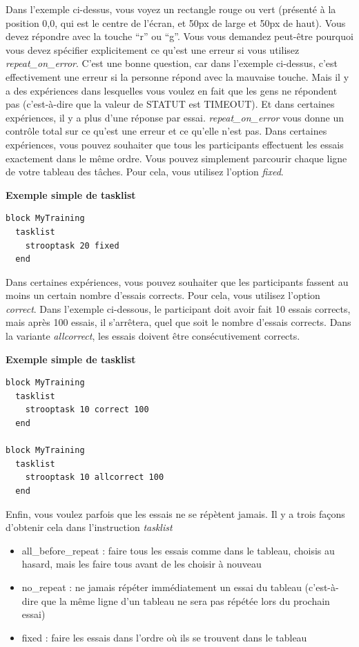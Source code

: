 \documentclass[
]{book}
\providecommand{\tightlist}{%
  \setlength{\itemsep}{0pt}\setlength{\parskip}{0pt}}
\begin{document}
Dans l'exemple ci-dessus, vous voyez un rectangle rouge ou vert (présenté à la position 0,0, qui est le centre de l'écran, et 50px de large et 50px de haut). Vous devez répondre avec la touche ``r'' ou ``g''. Vous vous demandez peut-être pourquoi vous devez spécifier explicitement ce qu'est une erreur si vous utilisez \emph{repeat\_on\_error}. C'est une bonne question, car dans l'exemple ci-dessus, c'est effectivement une erreur si la personne répond avec la mauvaise touche. Mais il y a des expériences dans lesquelles vous voulez en fait que les gens ne répondent pas (c'est-à-dire que la valeur de STATUT est TIMEOUT). Et dans certaines expériences, il y a plus d'une réponse par essai. \emph{repeat\_on\_error} vous donne un contrôle total sur ce qu'est une erreur et ce qu'elle n'est pas.
Dans certaines expériences, vous pouvez souhaiter que tous les participants effectuent les essais exactement dans le même ordre. Vous pouvez simplement parcourir chaque ligne de votre tableau des tâches. Pour cela, vous utilisez l'option \emph{fixed}.

\textbf{Exemple simple de tasklist}

\begin{verbatim}
block MyTraining
  tasklist
    strooptask 20 fixed
  end
\end{verbatim}

Dans certaines expériences, vous pouvez souhaiter que les participants fassent au moins un certain nombre d'essais corrects. Pour cela, vous utilisez l'option \emph{correct}. Dans l'exemple ci-dessous, le participant doit avoir fait 10 essais corrects, mais après 100 essais, il s'arrêtera, quel que soit le nombre d'essais corrects. Dans la variante \emph{allcorrect}, les essais doivent être consécutivement corrects.

\textbf{Exemple simple de tasklist}

\begin{verbatim}
block MyTraining
  tasklist
    strooptask 10 correct 100
  end

block MyTraining
  tasklist
    strooptask 10 allcorrect 100
  end
\end{verbatim}

Enfin, vous voulez parfois que les essais ne se répètent jamais. Il y a trois façons d'obtenir cela dans l'instruction \emph{tasklist}

\begin{itemize}
\tightlist
\item
  all\_before\_repeat : faire tous les essais comme dans le tableau, choisis au hasard, mais les faire tous avant de les choisir à nouveau
\item
  no\_repeat : ne jamais répéter immédiatement un essai du tableau (c'est-à-dire que la même ligne d'un tableau ne sera pas répétée lors du prochain essai)
\item
  fixed : faire les essais dans l'ordre où ils se trouvent dans le tableau
\end{itemize}
\end{document}
